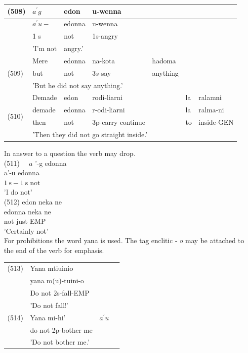 \documentclass[10pt]{article}
\begin{document}
\begin{center}
\begin{tabular}{|l|l|l|l|l|l|l|}
\hline
\multirow[t]{4}{*}{(508)} & \(a^{\prime} g\) & edon & u-wenna &  & \multirow{4}{*}{} &  \\
\hline
 & \(a^{\prime} u-\) & edonna & u-wenna &  &  &  \\
\hline
 & 1 s & not & 1s-angry &  &  &  \\
\hline
 & 'I'm not & angry.' &  &  &  &  \\
\hline
\multirow[t]{3}{*}{(509)} & Mere & edonna & na-kota & hadoma & \multicolumn{2}{|c|}{\multirow{3}{*}{}} \\
\hline
 & but & not & \(3 s\)-say & anything &  &  \\
\hline
 & \multicolumn{4}{|l|}{'But he did not say anything.'} &  &  \\
\hline
\multirow[t]{4}{*}{(510)} & Demade & edon & rodi-liarni &  & la & ralamni \\
\hline
 & demade & edonna & r-odi-liarni &  & la & ralma-ni \\
\hline
 & then & not & 3p-carry continue &  & to & inside-GEN \\
\hline
 & \multicolumn{6}{|l|}{'Then they did not go straight inside.'} \\
\hline
\end{tabular}
\end{center}

In answer to a question the verb may drop.\\
(511) \(\quad a\) '-g edonna\\
a'-u edonna\\
\(1 \mathrm{~s}-1 \mathrm{~s}\) not\\
'I do not'\\
(512) edon neka ne\\
edonna neka ne\\
not just EMP\\
'Certainly not'\\
For prohibitions the word yana is used. The tag enclitic - \(o\) may be attached to the end of the verb for emphasis.

\begin{center}
\begin{tabular}{llll}
(513) & Yana mtiuinio &  \\
 & yana m(u)-tuini-o &  \\
 & Do not 2s-fall-EMP &  \\
 & 'Do not fall!' &  \\
(514) & Yana mi-hi' & \(a^{\prime} u\) \\
 & do not 2p-bother me &  \\
 & 'Do not bother me.' &  \\
\end{tabular}
\end{center}
\end{document}
